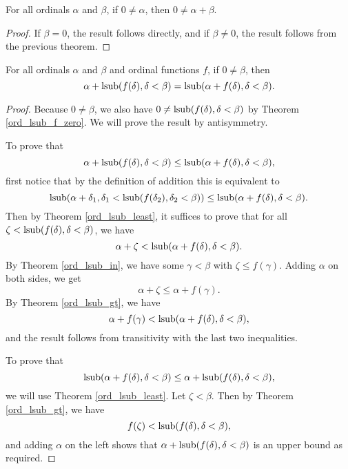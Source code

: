 \documentclass[../../math.tex]{subfiles}
\begin{document}
\begin{theorem} \label{ord_nz_lplus}
    For all ordinals $\alpha$ and $\beta$, if $0 \neq \alpha$, then $0 \neq
    \alpha + \beta$.
\end{theorem}
\begin{proof}
    If $\beta = 0$, the result follows directly, and if $\beta \neq 0$, the
    result follows from the previous theorem.
\end{proof}

\begin{theorem} \label{ord_lsub_plus}
    For all ordinals $\alpha$ and $\beta$ and ordinal functions $f$, if $0 \neq
    \beta$, then
    \[
        \alpha + \operatorname{lsub}(f(\delta), \delta < \beta)
        = \operatorname{lsub}(\alpha + f(\delta), \delta < \beta).
    \]
\end{theorem}
\begin{proof}
    Because $0 \neq \beta$, we also have $0 \neq \operatorname{lsub}(f(\delta), \delta <
    \beta)$ by Theorem \ref{ord_lsub_f_zero}.  We will prove the result by
    antisymmetry.

    To prove that
    \[
        \alpha + \operatorname{lsub}(f(\delta), \delta < \beta)
        \leq \operatorname{lsub}(\alpha + f(\delta), \delta < \beta),
    \]
    first notice that by the definition of addition this is equivalent to
    \[
        \operatorname{lsub}(\alpha + \delta_1, \delta_1 < \operatorname{lsub}(f(\delta_2), \delta_2 <
        \beta)) \leq \operatorname{lsub}(\alpha + f(\delta), \delta < \beta).
    \]
    Then by Theorem \ref{ord_lsub_least}, it suffices to prove that for all
    $\zeta < \operatorname{lsub}(f(\delta), \delta < \beta)$, we have
    \[
        \alpha + \zeta < \operatorname{lsub}(\alpha + f(\delta), \delta < \beta).
    \]
    By Theorem \ref{ord_lsub_in}, we have some $\gamma < \beta$ with $\zeta
    \leq f(\gamma)$.  Adding $\alpha$ on both sides, we get
    \[
        \alpha + \zeta \leq \alpha + f(\gamma).
    \]
    By Theorem \ref{ord_lsub_gt}, we have
    \[
        \alpha + f(\gamma) < \operatorname{lsub}(\alpha + f(\delta), \delta < \beta),
    \]
    and the result follows from transitivity with the last two inequalities.

    To prove that
    \[
        \operatorname{lsub}(\alpha + f(\delta), \delta < \beta)
        \leq \alpha + \operatorname{lsub}(f(\delta), \delta < \beta),
    \]
    we will use Theorem \ref{ord_lsub_least}.  Let $\zeta < \beta$.  Then by
    Theorem \ref{ord_lsub_gt}, we have
    \[
        f(\zeta) < \operatorname{lsub}(f(\delta), \delta < \beta),
    \]
    and adding $\alpha$ on the left shows that $\alpha + \operatorname{lsub}(f(\delta), \delta
    < \beta)$ is an upper bound as required.
\end{proof}
\end{document}
